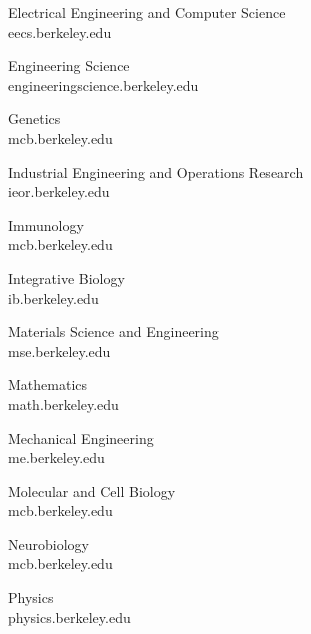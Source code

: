 Electrical Engineering and Computer Science \\
{\selectfont eecs.berkeley.edu}

Engineering Science \\
{\selectfont engineeringscience.berkeley.edu}

Genetics \\
{\selectfont mcb.berkeley.edu}

Industrial Engineering and Operations Research \\
{\selectfont ieor.berkeley.edu}

Immunology \\
{\selectfont mcb.berkeley.edu}

Integrative Biology \\
{\selectfont ib.berkeley.edu}

Materials Science and Engineering \\
{\selectfont mse.berkeley.edu}

Mathematics \\
{\selectfont math.berkeley.edu}

Mechanical Engineering \\
{\selectfont me.berkeley.edu}

Molecular and Cell Biology \\
{\selectfont mcb.berkeley.edu}

Neurobiology \\
{\selectfont mcb.berkeley.edu}

Physics \\
{\selectfont physics.berkeley.edu}

